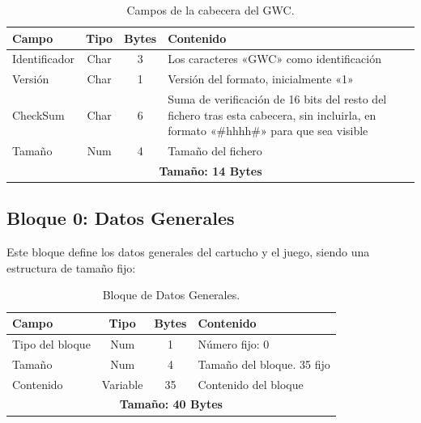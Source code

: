 \begin{table}[H]
	\centering
	\begin{tabular}{|l|c|c|p{8.4cm}|}
		\hline
		\textbf{Campo} & \textbf{Tipo} & \textbf{Bytes} & \textbf{Contenido} \\
		\hline
		
		Identificador & Char & 3 & Los caracteres «GWC» como identificación \\ \hline
		
		Versión & Char & 1 & Versión del formato, inicialmente «1» \\ \hline
		
		CheckSum & Char & 6 & Suma de verificación de 16 bits del resto del fichero tras esta cabecera, sin incluirla, en formato «\#hhhh\#» para que sea visible\footnotemark \\ \hline
		
		Tamaño & Num & 4 & Tamaño del fichero \\ \hline	
		\hline\hline
		\multicolumn{4}{c}{\textbf{Tamaño: 14 Bytes}} \\ \hline
	\end{tabular}
	\caption{Campos de la cabecera del GWC.}
	\label{tab:cabeceraGWC}
\end{table}


\subsection{Bloque 0: Datos Generales}
\label{sec:F5I2DatosGenerales}

Este bloque define los datos generales del cartucho y el juego, siendo una estructura de tamaño fijo:

\begin{table}[htbp]
	\centering
	\begin{tabular}{|l|c|c|p{8.4cm}|}
		\hline
		\textbf{Campo} & \textbf{Tipo} & \textbf{Bytes} & \textbf{Contenido} \\
		\hline
		Tipo del bloque & Num & 1 & Número fijo: 0\\
		\hline
		
		Tamaño & Num & 4 & Tamaño del bloque. 35 fijo \\
		\hline
		
		Contenido & Variable & 35 & Contenido del bloque \\
		
		\hline\hline
		\multicolumn{4}{c}{\textbf{Tamaño: 40 Bytes}} \\ \hline
	\end{tabular}
	\caption{Bloque de Datos Generales.}
\end{table}

